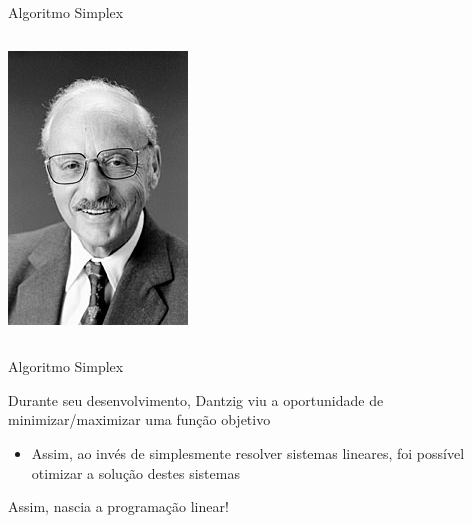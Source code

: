 \documentclass[compress,mathserif]{beamer}
\begin{document}
\begin{frame}{Algoritmo Simplex}
\begin{columns}[T]
\begin{column}{.39\textwidth}
    \centering \includegraphics[width=\textwidth]{images/dantzig.jpg}
    \end{column}
\end{columns}
\end{frame}


\begin{frame}{Algoritmo Simplex}

Durante seu desenvolvimento, Dantzig viu a oportunidade de minimizar/maximizar uma função objetivo
\begin{itemize}
    \item Assim, ao invés de simplesmente resolver sistemas lineares, foi possível otimizar a solução destes sistemas
\end{itemize}

\vspace{1cm}

Assim, nascia a programação linear!
\end{frame}
\end{document}

